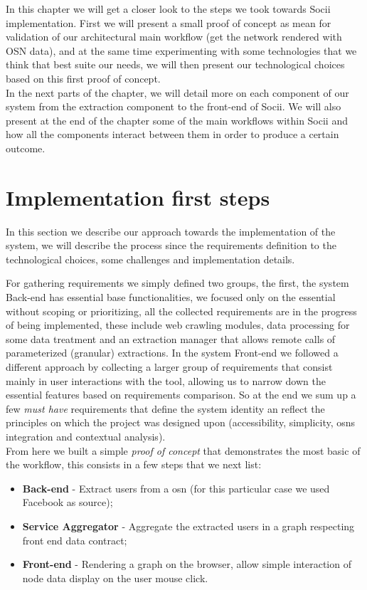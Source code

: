 In this chapter we will get a closer look to the steps we took towards Socii implementation. First we will present a small proof of concept as mean for validation of our architectural main workflow (get the network rendered with OSN data), and at the same time experimenting with some technologies that we think that best suite our needs, we will then present our technological choices based on this first proof of concept.\\
\indent In the next parts of the chapter, we will detail more on each component of our system from the extraction component to the front-end of Socii. We will also present at the end of the chapter some of the main workflows within Socii and how all the components interact between them in order to produce a certain outcome.

\section{Implementation first steps}
In this section we describe our approach towards the implementation of the system, we will describe the process since the requirements
definition to the technological choices, some challenges and implementation details.

For gathering requirements we simply defined two groups, the first, the system Back-end has essential base functionalities, we focused only
on the essential without scoping or prioritizing, all the collected requirements are in the progress of being implemented, these include web crawling modules, data processing for some data treatment and an extraction manager that allows remote calls of parameterized (granular) extractions.
In the system Front-end we followed a different approach by collecting a larger group of requirements that consist mainly in user interactions with the tool,
allowing us to narrow down the essential features based on requirements comparison. So at the end we sum up a few \textit{must have} requirements that
define the system identity an reflect the principles on which the project was designed upon (accessibility, simplicity, \glspl{osn} integration and contextual analysis).\\

\indent From here we built a simple \textit{proof of concept} that demonstrates the most basic of the workflow, this consists in a few steps that we next list:
\begin{itemize}
    \item \textbf{Back-end} - Extract users from a \gls{osn} (for this particular case we used Facebook as source);
    \item \textbf{Service Aggregator} - Aggregate the extracted users in a graph respecting front end data contract;
    \item \textbf{Front-end} - Rendering a graph on the browser, allow simple interaction of node data display on the user mouse click.
\end{itemize}

